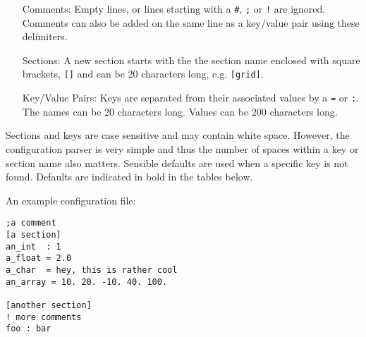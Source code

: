 \begin{itemize}
\item[Comments:] Empty lines, or lines starting with a \texttt{\#}, \texttt{;} or \texttt{!} are ignored.  Comments can also be added on the same line as a key/value pair using these delimiters.
\item[Sections:] A new section starts with the the section name enclosed with square brackets, \texttt{[]} and can be 20 characters long, e.g. \texttt{[grid]}.
\item[Key/Value Pairs:] Keys are separated from their associated values by a \texttt{=} or \texttt{:}. The names can be 20 characters long. Values can be 200 characters long.
\end{itemize}

Sections and keys are case sensitive and may contain white space. 
However, the configuration parser is very simple and thus the number of spaces 
within a key or section name also matters. Sensible defaults are used when 
a specific key is not found.  Defaults are indicated in bold in the tables below.

An example configuration file:
\begin{verbatim}
;a comment
[a section]
an_int  : 1
a_float = 2.0
a_char  = hey, this is rather cool
an_array = 10. 20. -10. 40. 100.

[another section]
! more comments
foo : bar
\end{verbatim}



